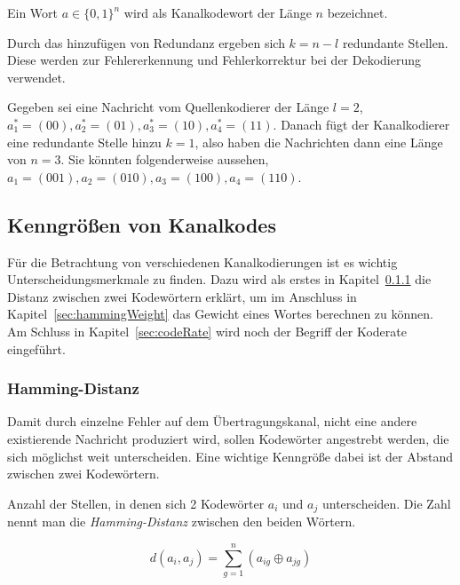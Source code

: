\begin{t_def}
Ein Wort $a \in \{0,1\}^n$ wird als Kanalkodewort der Länge $n$ bezeichnet.
\end{t_def} 

Durch das hinzufügen von Redundanz ergeben sich $k = n - l$ redundante Stellen. Diese werden zur Fehlererkennung und Fehlerkorrektur bei der Dekodierung verwendet.

\begin{e_exa}
Gegeben sei eine Nachricht vom Quellenkodierer der Länge $l=2$, $a^*_{1}=(00),a^*_{2}=(01),a^*_{3}=(10),a^*_{4}=(11)$. Danach fügt der Kanalkodierer eine redundante Stelle hinzu $k=1$, also haben die Nachrichten dann eine Länge von $n=3$. Sie könnten folgenderweise aussehen, $a_{1}=(001),a_{2}=(010),a_{3}=(100),a_{4}=(110)$.
\end{e_exa}

\subsection{Kenngrößen von Kanalkodes}
\label{sec:channelParameters}
Für die Betrachtung von verschiedenen Kanalkodierungen ist es wichtig Unterscheidungsmerkmale zu finden. Dazu wird als erstes in Kapitel~\ref{sec:hammingDistance} die Distanz zwischen zwei Kodewörtern erklärt, um im Anschluss in Kapitel~\ref{sec:hammingWeight} das Gewicht eines Wortes berechnen zu können. Am Schluss in Kapitel~\ref{sec:codeRate} wird noch der Begriff der Koderate eingeführt.

\subsubsection{Hamming-Distanz}
\label{sec:hammingDistance}
Damit durch einzelne Fehler auf dem Übertragungskanal, nicht eine andere existierende Nachricht produziert wird, sollen Kodewörter angestrebt werden, die sich möglichst weit unterscheiden. Eine wichtige Kenngröße dabei ist der Abstand zwischen zwei Kodewörtern.

\begin{t_def}
Anzahl der Stellen, in denen sich 2 Kodewörter $a_i$ und $a_j$ unterscheiden. Die Zahl nennt man die \emph{Hamming-Distanz} zwischen den beiden Wörtern.
\end{t_def} 
 
\begin{equation}
d(a_i,a_j) = \sum^{n}_{g=1} (a_{ig} \oplus a_{jg})
\label{eq:hammingDistance}
\end{equation}

